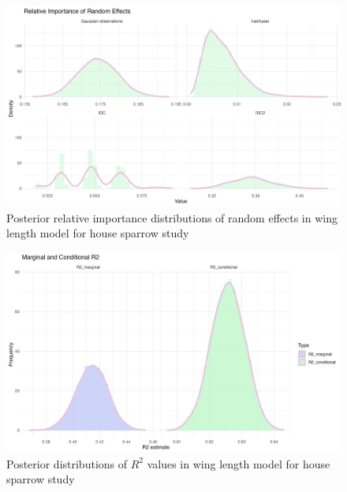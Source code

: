 \begin{figure}[H]%
  \centering
  \includegraphics[width=1\linewidth]{Figures/House sparrow study/Wing_random.png}
  \caption[Posterior relative importance distributions of random effects in wing length model for house sparrow study]{Posterior relative importance distributions of random effects in wing length model for house sparrow study}
  \label{fig:wing_random_sparrows}
\end{figure}

\begin{figure}[H]%
  \centering
  \includegraphics[width=1\linewidth]{Figures/House sparrow study/Wing_r2.png}
  \caption[Posterior distributions of $R^2$ values in wing length model for house sparrow study]{Posterior distributions of $R^2$ values in wing length model for house sparrow study}
  \label{fig:wing_r2}
\end{figure}

